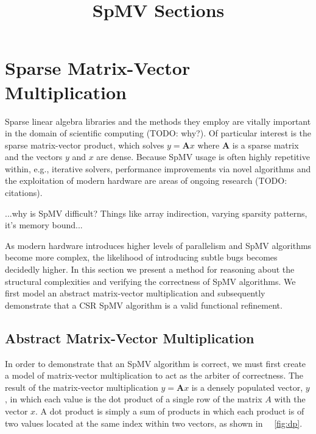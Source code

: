 \documentclass[sigconf]{acmart}
\begin{document}
\pagestyle{plain}
\title{SpMV Sections}
\maketitle

\section{Sparse Matrix-Vector Multiplication}

Sparse linear algebra libraries and the methods they employ are vitally important in the domain of scientific computing (TODO: why?).  Of particular interest is the sparse matrix-vector product, which solves $y = \bm{A}x$ where $\bm{A}$ is a sparse matrix and the vectors $y$ and $x$ are dense.  Because SpMV usage is often highly repetitive within, e.g., iterative solvers, performance improvements via novel algorithms and the exploitation of modern hardware are areas of ongoing research (TODO: citations).

...why is SpMV difficult? Things like array indirection, varying sparsity patterns, it's memory bound...

As modern hardware introduces higher levels of parallelism and SpMV algorithms become more complex, the likelihood of introducing subtle bugs becomes decidedly higher.  In this section we present a method for reasoning about the structural complexities and verifying the correctness of SpMV algorithms.  We first model an abstract matrix-vector multiplication and subsequently demonstrate that a CSR SpMV algorithm is a valid functional refinement.

\subsection{Abstract Matrix-Vector Multiplication}

In order to demonstrate that an SpMV algorithm is correct, we must first create a model of matrix-vector multiplication to act as the arbiter of correctness.  The result of the matrix-vector multiplication $y = \bm{A}x$ is a densely populated vector, $y$, in which each value is the dot product of a single row of the matrix $A$ with the vector $x$.  A dot product is simply a sum of products in which each product is of two values located at the same index within two vectors, as shown in ~\figurename~\ref{fig:dp}.
\end{document}

